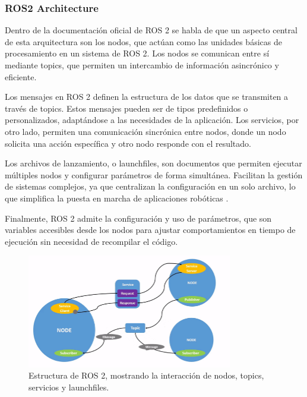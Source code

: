     \subsubsection{ROS2 Architecture}

    Dentro de la documentación oficial de ROS 2 se habla de que un aspecto central de esta arquitectura son los nodos, que actúan como las unidades básicas de procesamiento en un sistema de ROS 2. Los nodos se comunican entre sí mediante topics, que permiten un intercambio de información asincrónico y eficiente.

    Los mensajes en ROS 2 definen la estructura de los datos que se transmiten a través de topics. Estos mensajes pueden ser de tipos predefinidos o personalizados, adaptándose a las necesidades de la aplicación. Los servicios, por otro lado, permiten una comunicación sincrónica entre nodos, donde un nodo solicita una acción específica y otro nodo responde con el resultado.

    Los archivos de lanzamiento, o launchfiles, son documentos que permiten ejecutar múltiples nodos y configurar parámetros de forma simultánea. Facilitan la gestión de sistemas complejos, ya que centralizan la configuración en un solo archivo, lo que simplifica la puesta en marcha de aplicaciones robóticas \cite{ros_docs}.

    Finalmente, ROS 2 admite la configuración y uso de parámetros, que son variables accesibles desde los nodos para ajustar comportamientos en tiempo de ejecución sin necesidad de recompilar el código.

    \begin{figure}[h!] 
    \centering 
    \includegraphics[width=0.8\textwidth]{pictures/ros2_arch.png} %
    \caption{Estructura de ROS 2, mostrando la interacción de nodos, topics, servicios y launchfiles.}
    \label{fig} 
    \end{figure}

